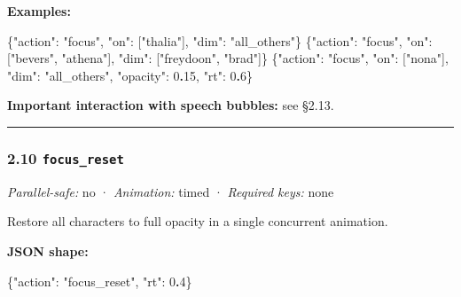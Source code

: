 \documentclass[
  12pt,
  letterpaper,
]{book}
\newenvironment{Shaded}{}{}
\newcommand{\DataTypeTok}[1]{\textcolor[rgb]{0.56,0.13,0.00}{#1}}
\newcommand{\DecValTok}[1]{\textcolor[rgb]{0.25,0.63,0.44}{#1}}
\newcommand{\ErrorTok}[1]{\textcolor[rgb]{1.00,0.00,0.00}{\textbf{#1}}}
\newcommand{\FunctionTok}[1]{\textcolor[rgb]{0.02,0.16,0.49}{#1}}
\newcommand{\OtherTok}[1]{\textcolor[rgb]{0.00,0.44,0.13}{#1}}
\newcommand{\StringTok}[1]{\textcolor[rgb]{0.25,0.44,0.63}{#1}}
\begin{document}
\textbf{Examples:}

\begin{Shaded}
\begin{Highlighting}[]
\FunctionTok{\{}\DataTypeTok{"action"}\FunctionTok{:} \StringTok{"focus"}\FunctionTok{,} \DataTypeTok{"on"}\FunctionTok{:} \OtherTok{[}\StringTok{"thalia"}\OtherTok{]}\FunctionTok{,} \DataTypeTok{"dim"}\FunctionTok{:} \StringTok{"all\_others"}\FunctionTok{\}}
\FunctionTok{\{}\DataTypeTok{"action"}\FunctionTok{:} \StringTok{"focus"}\FunctionTok{,} \DataTypeTok{"on"}\FunctionTok{:} \OtherTok{[}\StringTok{"bevers"}\OtherTok{,} \StringTok{"athena"}\OtherTok{]}\FunctionTok{,} \DataTypeTok{"dim"}\FunctionTok{:} \OtherTok{[}\StringTok{"freydoon"}\OtherTok{,} \StringTok{"brad"}\OtherTok{]}\FunctionTok{\}}
\FunctionTok{\{}\DataTypeTok{"action"}\FunctionTok{:} \StringTok{"focus"}\FunctionTok{,} \DataTypeTok{"on"}\FunctionTok{:} \OtherTok{[}\StringTok{"nona"}\OtherTok{]}\FunctionTok{,} \DataTypeTok{"dim"}\FunctionTok{:} \StringTok{"all\_others"}\FunctionTok{,} \DataTypeTok{"opacity"}\FunctionTok{:} \DecValTok{0}\ErrorTok{.}\DecValTok{15}\FunctionTok{,} \DataTypeTok{"rt"}\FunctionTok{:} \DecValTok{0}\ErrorTok{.}\DecValTok{6}\FunctionTok{\}}
\end{Highlighting}
\end{Shaded}

\textbf{Important interaction with speech bubbles:} see §2.13.

\begin{center}\rule{0.5\linewidth}{0.5pt}\end{center}

\subsubsection{\texorpdfstring{2.10
\texttt{focus\_reset}}{2.10 focus\_reset}}\label{focus_reset}

\emph{Parallel-safe:} no · \emph{Animation:} timed · \emph{Required
keys:} none

Restore all characters to full opacity in a single concurrent animation.

\textbf{JSON shape:}

\begin{Shaded}
\begin{Highlighting}[]
\FunctionTok{\{}\DataTypeTok{"action"}\FunctionTok{:} \StringTok{"focus\_reset"}\FunctionTok{,} \DataTypeTok{"rt"}\FunctionTok{:} \DecValTok{0}\ErrorTok{.}\DecValTok{4}\FunctionTok{\}}
\end{Highlighting}
\end{Shaded}
\end{document}
